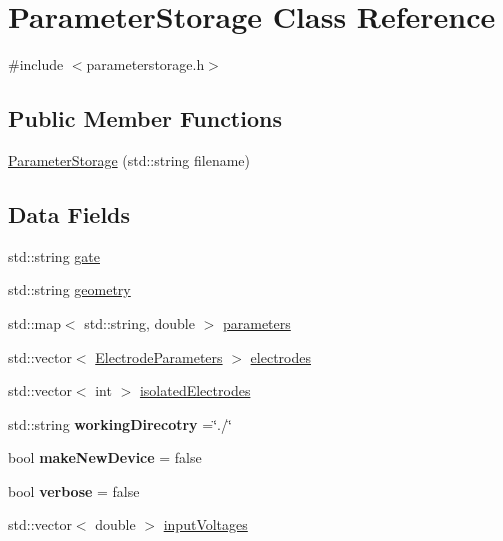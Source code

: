 \hypertarget{classParameterStorage}{}\section{Parameter\+Storage Class Reference}
\label{classParameterStorage}


{\ttfamily \#include $<$parameterstorage.\+h$>$}

\subsection*{Public Member Functions}
\begin{DoxyCompactItemize}
\item 
\hyperlink{classParameterStorage_a024e6d70a1b33d29e64f72657fb15ba8}{Parameter\+Storage} (std\+::string filename)
\end{DoxyCompactItemize}
\subsection*{Data Fields}
\begin{DoxyCompactItemize}
\item 
std\+::string \hyperlink{classParameterStorage_ab870128f261ec92df497b10f85cdc9e0}{gate}
\item 
std\+::string \hyperlink{classParameterStorage_a67fb9f2ff387b416e39c62db6ec85473}{geometry}
\item 
std\+::map$<$ std\+::string, double $>$ \hyperlink{classParameterStorage_a3ae6709dcacaf500c8f57808a52d9be2}{parameters}
\item 
std\+::vector$<$ \hyperlink{structElectrodeParameters}{Electrode\+Parameters} $>$ \hyperlink{classParameterStorage_aec3f7cac18829cd67387d9a568547dbf}{electrodes}
\item 
std\+::vector$<$ int $>$ \hyperlink{classParameterStorage_a7560bf11dfebc665f00a251b2140039b}{isolated\+Electrodes}
\item 
\mbox{\label{classParameterStorage_a03c07ba0b5172196924d855b07f021c5}} 
std\+::string {\bfseries working\+Direcotry} =\char`\"{}./\char`\"{}
\item 
\mbox{\label{classParameterStorage_a387b9c88ad5b8a77a8f75ac409ab53a2}} 
bool {\bfseries make\+New\+Device} = false
\item 
\mbox{\label{classParameterStorage_aa6cd44d0c09c0f0f5df753b556308ef3}} 
bool {\bfseries verbose} = false
\item 
std\+::vector$<$ double $>$ \hyperlink{classParameterStorage_a139852057ae4212e7365da8f48a8ff1f}{input\+Voltages}
\end{DoxyCompactItemize}


